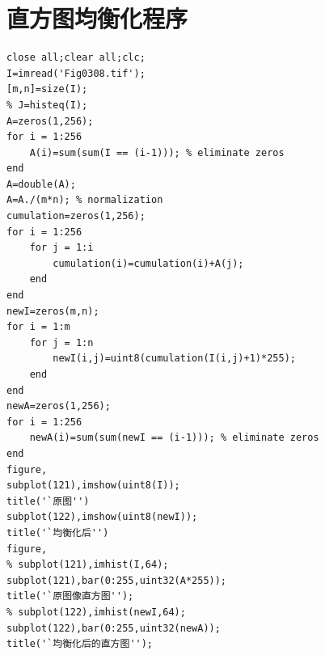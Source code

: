 \documentclass[logo,reportComp]{thesis}
\begin{document}
\section{直方图均衡化程序}
\begin{lstlisting}
close all;clear all;clc;
I=imread('Fig0308.tif');
[m,n]=size(I);
% J=histeq(I);
A=zeros(1,256);
for i = 1:256
    A(i)=sum(sum(I == (i-1))); % eliminate zeros
end
A=double(A);
A=A./(m*n); % normalization
cumulation=zeros(1,256);
for i = 1:256
    for j = 1:i
        cumulation(i)=cumulation(i)+A(j);
    end
end
newI=zeros(m,n);
for i = 1:m
    for j = 1:n
        newI(i,j)=uint8(cumulation(I(i,j)+1)*255);
    end
end
newA=zeros(1,256);
for i = 1:256
    newA(i)=sum(sum(newI == (i-1))); % eliminate zeros
end
figure,
subplot(121),imshow(uint8(I));
title('`原图'')
subplot(122),imshow(uint8(newI));
title('`均衡化后'')
figure,
% subplot(121),imhist(I,64);
subplot(121),bar(0:255,uint32(A*255));
title('`原图像直方图'');
% subplot(122),imhist(newI,64);
subplot(122),bar(0:255,uint32(newA));
title('`均衡化后的直方图'');
\end{lstlisting}
\end{document}
